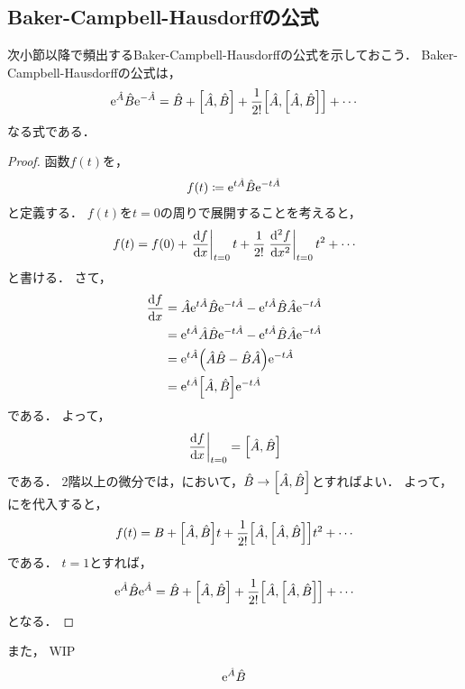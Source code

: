 \documentclass{report}
\begin{document}
  \subsection{Baker-Campbell-Hausdorffの公式}
    次小節以降で頻出するBaker-Campbell-Hausdorffの公式を示しておこう．
    Baker-Campbell-Hausdorffの公式は，
    \begin{align}
      \mathrm{e}^{\hat{A}}\hat{B}\mathrm{e}^{-\hat{A}} = \hat{B} + \qty[\hat{A}, \hat{B}] + \frac{1}{2!}\qty[\hat{A}, \qty[\hat{A}, \hat{B}]] + \cdots
    \end{align}
    なる式である．
    \begin{proof}
      函数$f(t)$を，
      \begin{align}
        f(t) \coloneqq \mathrm{e}^{t\hat{A}}\hat{B}\mathrm{e}^{-t\hat{A}}
      \end{align}
      と定義する．
      $f(t)$を$t = 0$の周りで展開することを考えると，
      \begin{align}
        f(t) = f(0) + \eval{\dv{f}{x}}_{t = 0}t + \frac{1}{2!}\eval{\dv[2]{f}{x}}_{t = 0} t^2 + \cdots\label{taylor-bch}
      \end{align}
      と書ける．
      さて，
      \begin{align}
        \dv{f}{x} &= \hat{A}\mathrm{e}^{t\hat{A}}\hat{B}\mathrm{e}^{-t\hat{A}} - \mathrm{e}^{t\hat{A}}\hat{B}\hat{A}\mathrm{e}^{-t\hat{A}} \\ 
        &= \mathrm{e}^{t\hat{A}}\hat{A}\hat{B}\mathrm{e}^{-t\hat{A}} - \mathrm{e}^{t\hat{A}}\hat{B}\hat{A}\mathrm{e}^{-t\hat{A}} \\ 
        &= \mathrm{e}^{t\hat{A}}\qty(\hat{A}\hat{B} - \hat{B}\hat{A})\mathrm{e}^{-t\hat{A}} \\ 
        &= \mathrm{e}^{t\hat{A}}\qty[\hat{A}, \hat{B}]\mathrm{e}^{-t\hat{A}}\label{1st-diff-bch}
      \end{align}
      である．
      よって，
      \begin{align}
        \eval{\dv{f}{x}}_{t = 0} = \qty[\hat{A}, \hat{B}]
      \end{align}
      である．
      2階以上の微分では，において，$\hat{B} \to \qty[\hat{A}, \hat{B}]$とすればよい．
      よって，にを代入すると，
      \begin{align}
        f(t) = B + \qty[\hat{A}, \hat{B}]t + \frac{1}{2!}\qty[\hat{A}, \qty[\hat{A}, \hat{B}]]t^2 + \cdots
      \end{align}
      である．
      $t = 1$とすれば，
      \begin{align}
        \mathrm{e}^{\hat{A}}\hat{B}\mathrm{e}^{\hat{A}} = \hat{B} + \qty[\hat{A}, \hat{B}] + \frac{1}{2!}\qty[\hat{A}, \qty[\hat{A}, \hat{B}]] + \cdots
      \end{align}
      となる．
    \end{proof}
    また，
    WIP
    \begin{align}
      \mathrm{e}^{\hat{A}}\hat{B}
    \end{align}
\end{document}
